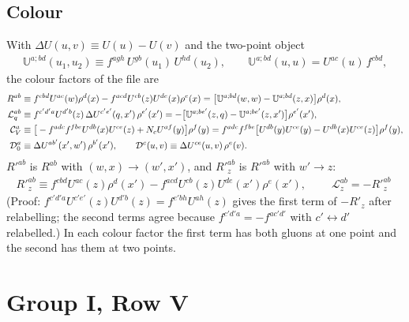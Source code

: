 \documentclass[10pt]{article}
\numberwithin{equation}{section}
\begin{document}
\subsection{Colour}
With $\Delta U(u,v)\equiv U(u)-U(v)$ and the two-point object
\begin{align}
\mathbb{U}^{a;bd}(u_{1},u_{2})\equiv f^{agh}\,U^{gb}(u_{1})\,U^{hd}(u_{2}),\qquad \mathbb{U}^{a;bd}(u,u)=U^{ac}(u)\,f^{cbd},
\end{align}
the colour factors of the file are
\begin{align}
R^{ab}&\equiv f^{cbd}U^{ac}(w)\rho^{d}(x)-f^{acd}U^{cb}(z)U^{de}(x)\rho^{e}(x)=\big[\mathbb{U}^{a;bd}(w,w)-\mathbb{U}^{a;bd}(z,x)\big]\rho^{d}(x),\notag\\
\mathcal{L}^{ab}_{q}&\equiv f^{c'd'a}U^{d'b}(z)\,\Delta U^{c'e'}(q,x')\,\rho^{e'}(x')=-\big[\mathbb{U}^{a;be'}(z,q)-\mathbb{U}^{a;be'}(z,x')\big]\rho^{e'}(x'),\notag\\
\mathcal{C}_{V}^{a}&\equiv\big[-f^{adc}f^{fbe}U^{db}(x)U^{ce}(z)+N_{c}U^{af}(y)\big]\rho^{f}(y)=f^{adc}f^{fbe}\big[U^{db}(y)U^{ce}(y)-U^{db}(x)U^{ce}(z)\big]\rho^{f}(y),\notag\\
\mathcal{D}_{0}^{a}&\equiv\Delta U^{ab'}(x',w')\,\rho^{b'}(x'),\qquad
\mathcal{D}^{c}(u,v)\equiv\Delta U^{ce}(u,v)\,\rho^{e}(v). \label{eq:colour}
\end{align}
$R'^{ab}$ is $R^{ab}$ with $(w,x)\to(w',x')$, and $R'^{ab}_{z}$ is $R'^{ab}$ with $w'\to z$:
\begin{align}
R'^{ab}_{z}\equiv f^{cbd}U^{ac}(z)\rho^{d}(x')-f^{acd}U^{cb}(z)U^{de}(x')\rho^{e}(x'),\qquad\boxed{\;\mathcal{L}^{ab}_{z}=-R'^{ab}_{z}\;} \label{eq:Lz}
\end{align}
(Proof: $f^{c'd'a}U^{c'e'}(z)U^{d'b}(z)=f^{e'bh}U^{ah}(z)$ gives the first term of $-R'_{z}$ after relabelling; the second terms agree because $f^{c'd'a}=-f^{ac'd'}$ with $c'\leftrightarrow d'$ relabelled.) In each colour factor the first term has both gluons at one point and the second has them at two points.

\section{Group I, Row V}
\end{document}
